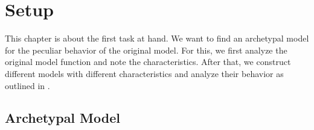 \chapter{Setup}
\label{chap:setup}

This chapter is about the first task at hand.
We want to find an archetypal model for the peculiar behavior of the original model.
For this, we first analyze the original model function and note the characteristics.
After that, we construct different models with different characteristics and analyze their behavior as outlined in .




%







\section{Archetypal Model}



